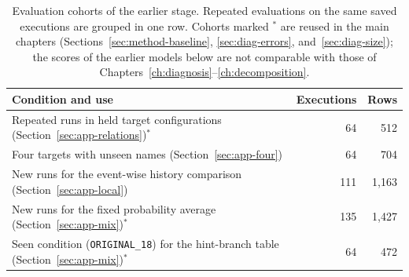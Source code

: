 \begin{table}[htbp]
\centering
\caption[Evaluation cohorts of the earlier stage]{Evaluation cohorts of the earlier stage. Repeated evaluations on
the same saved executions are grouped in one row. Cohorts marked
$^{*}$ are reused in the main chapters (Sections~\ref{sec:method-baseline},
\ref{sec:diag-errors}, and~\ref{sec:diag-size}); the scores of the
earlier models below are not comparable with those of
Chapters~\ref{ch:diagnosis}--\ref{ch:decomposition}.}
\label{tab:cohorts}
\begin{tabularx}{\textwidth}{@{}Xrr@{}}
\toprule
Condition and use & Executions & Rows \\
\midrule
Repeated runs in held target configurations (Section~\ref{sec:app-relations})$^{*}$ & 64 & 512 \\
Four targets with unseen names (Section~\ref{sec:app-four}) & 64 & 704 \\
New runs for the event-wise history comparison (Section~\ref{sec:app-local}) & 111 & 1,163 \\
New runs for the fixed probability average (Section~\ref{sec:app-mix})$^{*}$ & 135 & 1,427 \\
Seen condition (\texttt{ORIGINAL\_18}) for the hint-branch table (Section~\ref{sec:app-mix})$^{*}$ & 64 & 472 \\
\bottomrule
\end{tabularx}
\end{table}

